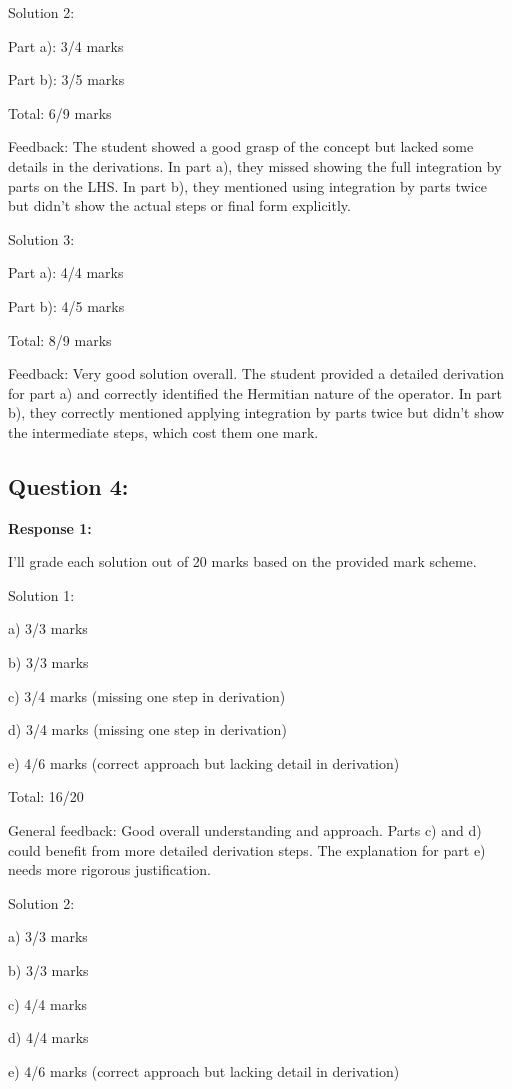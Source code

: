 \documentclass[a4paper,11pt]{article}
\begin{document}
Solution 2:

Part a): 3/4 marks

Part b): 3/5 marks

Total: 6/9 marks

Feedback: The student showed a good grasp of the concept but lacked some details in the derivations. In part a), they missed showing the full integration by parts on the LHS. In part b), they mentioned using integration by parts twice but didn't show the actual steps or final form explicitly.

Solution 3:

Part a): 4/4 marks

Part b): 4/5 marks

Total: 8/9 marks

Feedback: Very good solution overall. The student provided a detailed derivation for part a) and correctly identified the Hermitian nature of the operator. In part b), they correctly mentioned applying integration by parts twice but didn't show the intermediate steps, which cost them one mark.

\subsection*{Question 4:}

\textbf{Response 1:}

I'll grade each solution out of 20 marks based on the provided mark scheme.

Solution 1:

a) 3/3 marks

b) 3/3 marks

c) 3/4 marks (missing one step in derivation)

d) 3/4 marks (missing one step in derivation)

e) 4/6 marks (correct approach but lacking detail in derivation)

Total: 16/20

General feedback: Good overall understanding and approach. Parts c) and d) could benefit from more detailed derivation steps. The explanation for part e) needs more rigorous justification.

Solution 2:

a) 3/3 marks

b) 3/3 marks

c) 4/4 marks

d) 4/4 marks

e) 4/6 marks (correct approach but lacking detail in derivation)
\end{document}
